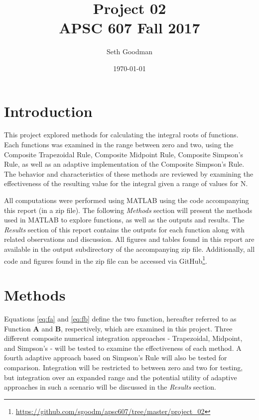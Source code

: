 \documentclass[a4paper]{article}
\title{
	Project 02 \\
	\bigskip
	\normalsize APSC 607 Fall 2017
}
\author{Seth Goodman}
\date{\today}
\begin{document}
\maketitle



\section{Introduction}
\label{sec:introduction}


This project explored methods for calculating the integral roots of functions. Each functions was  examined in the range between zero and two, using the Composite Trapezoidal Rule, Composite Midpoint Rule, Composite Simpson’s Rule, as well as an adaptive implementation of the Composite Simpson’s Rule. The behavior and characteristics of these methods are reviewed by examining the effectiveness of the resulting value for the integral given a range of values for N. 

All computations were performed using MATLAB using the code accompanying this report (in a zip file). The following \textit{Methods} section will present the methods used in MATLAB to explore functions, as well as the outputs and results. The \textit{Results} section of this report contains the outputs for each function along with related observations and discussion. All figures and tables found in this report are available in the output subdirectory of the accompanying zip file. Additionally, all code and figures found in the zip file can be accessed via GitHub\footnote{\url{https://github.com/sgoodm/apsc607/tree/master/project_02}}.



\newpage
\section{Methods}
\label{sec:methods}

Equations \ref{eq:fa} and \ref{eq:fb} define the two function, hereafter referred to as Function \textbf{A} and \textbf{B}, respectively, which are examined in this project. Three different composite numerical integration approaches - Trapezoidal, Midpoint, and Simpson's - will be tested to examine the effectiveness of each method. A fourth adaptive approach based on Simpson's Rule will also be tested for comparison. Integration will be restricted to between zero and two for testing, but integration over an expanded range and the potential utility of adaptive approaches in such a scenario will be discussed in the \textit{Results} section.
\end{document}
